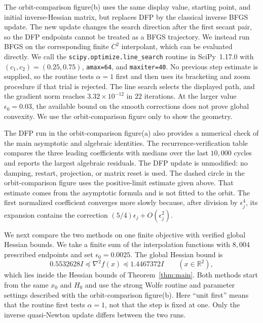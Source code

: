 \documentclass[11pt]{article}
\begin{document}
The orbit-comparison figure(b) uses the same display value, starting
point, and initial inverse-Hessian matrix, but replaces DFP by the classical
inverse BFGS update.  The new update changes the search direction after the
first secant pair, so the DFP endpoints cannot be treated as a BFGS
trajectory.  We instead run BFGS on the corresponding finite $C^2$
interpolant, which can be evaluated directly.  We call the
\texttt{scipy.optimize.line\_search} routine in SciPy~1.17.0
\cite{VirtanenEtAl2020} with
$(c_1,c_2)=(0.25,0.75)$, \texttt{amax=64}, and \texttt{maxiter=40}.  No
previous step estimate is supplied, so the routine tests $\alpha=1$ first and
then uses its bracketing and zoom procedure if that trial is rejected.  The
line search selects the displayed path, and the gradient norm reaches
$3.32\times10^{-12}$ in $22$ iterations.  At the larger value
$\epsilon_0=0.03$, the available bound on the smooth corrections does not
prove global convexity.  We use the orbit-comparison figure only to show
the geometry.

The DFP run in the orbit-comparison figure(a) also provides a numerical
check of the main asymptotic and algebraic identities.  The recurrence-verification table
compares the three leading coefficients with medians over the last $10{,}000$
cycles and reports the largest algebraic residuals.  The DFP update is
unmodified: no damping, restart, projection, or matrix reset is used.  The
dashed circle in the orbit-comparison figure uses the positive-limit
estimate given above.  That estimate comes from the asymptotic formula and is
not fitted to the orbit.  The first normalized coefficient converges more
slowly because, after division by $\epsilon_j^4$, its expansion contains the
correction $(5/4)\epsilon_j+O(\epsilon_j^2)$.




We next compare the two methods on one finite objective with verified global
Hessian bounds.  We take a finite sum of the interpolation functions with
$8{,}004$ prescribed endpoints and set $\epsilon_0=0.0025$.  The global
Hessian bound is
\[
0.5532628 I\preceq\nabla^2 f(x)\preceq1.4467372 I
\qquad(x\in\mathbb R^2),
\]
which lies inside the Hessian bounds of Theorem~\ref{thm:main}.  Both methods
start from the same $x_0$ and $H_0$ and use the strong Wolfe routine and
parameter settings described with the orbit-comparison figure(b).  Here
``unit first'' means that the routine first tests $\alpha=1$, not that the
step is fixed at one.  Only the inverse quasi-Newton update differs between
the two runs.
\end{document}
